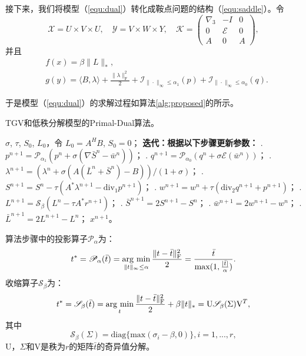 接下来，我们将模型（\ref{equ:dual}）转化成鞍点问题的结构（\ref{equ:saddle}）。令$$\mathcal{X}=U\times V\times U,\quad \mathcal{Y}=V\times W\times Y, \quad
	\mathcal{K}=
\begin{pmatrix}
\nabla_3 & -I & 0\\
0 & \mathcal{E} & 0\\
A & 0 & A
\end{pmatrix},
$$
并且
\begin{equation*}
\begin{aligned}
&f(x)=\beta\|L\|_*,\\
&g(y)=\langle B,\lambda\rangle+\frac{\|\lambda\|_\mathrm{F}^2}{2}+\mathcal{I}_{\|\cdot\|_\infty\leq\alpha_1}(p)+\mathcal{I}_{\|\cdot\|_\infty\leq\alpha_0}(q).
\end{aligned}
\end{equation*}

于是模型（\ref{equ:dual}）的求解过程如算法\ref{alg:proposed}的所示。

\begin{algorithm}
	\caption{TGV和低秩分解模型的Primal-Dual算法。}
	\label{alg:proposed}
	\begin{algorithmic}
		\REQUIRE $\sigma$, $\tau$, $S_0$, $L_0$，令 $L_0=A^HB$, $S_0=0$；
		\INDSTATE[-1.25] \textbf{迭代：根据以下步骤更新参数：}	
		. $p^{n+1} = \mathscr{P}_{\alpha_1}(p^n+\sigma(\nabla \bar{S}^n-\bar{w}^n))$；
		. $q^{n+1} = \mathscr{P}_{\alpha_0}(q^n+\sigma\mathcal{E}(\bar{w}^n))$；
		. $\lambda^{n+1} = (\lambda^{n}+\sigma(A(\bar{L}^n+\bar{S}^n)-B))/(1+\sigma)$；
		. $S^{n+1} = S^n-\tau(A^*\lambda^{n+1}-\mathrm{div}_1 p^{n+1})$；
		. $w^{n+1} = w^n+\tau(\mathrm{div}_2q^{n+1}+p^{n+1})$；
		. $L^{n+1} = \mathscr{S}_\beta(L^n-\tau A^*r^{n+1})$；
		. $\bar{S}^{n+1} = 2S^{n+1}-S^n$；
		. $\bar{w}^{n+1} = 2w^{n+1}-w^n$；
		. $\bar{L}^{n+1} = 2L^{n+1}-L^n$；
		\ENSURE $x^{n+1}$。
	\end{algorithmic}
\end{algorithm}

算法步骤中的投影算子$\mathscr{P}_\alpha$为：
$$t^*=\mathscr{P}_\alpha(\bar{t})=\argmin_{\|t\|_\infty\leq \alpha}\frac{\|t-\bar{t}\|^2_\mathrm{F}}{2}=\frac{\bar{t}}{\text{max}(1,\frac{|\bar{t}|}{\alpha})}.$$
收缩算子$\mathscr{S}_\beta$为：
$$t^*=\mathscr{S}_\beta(\bar{t})=\argmin_{t}\frac{\|t-\bar{t}\|_\mathrm{F}^2}{2}+\beta\|t\|_*=\mathrm{U}\mathscr{S}_\beta(\Sigma)\mathrm{V}^T,$$
其中
$$\mathscr{S}_\beta(\Sigma)=\mathrm{diag}\{\text{max}(\sigma_i-\beta,0)\}, i=1,...,r,$$
$\mathrm{U}$，$\Sigma$和$\mathrm{V}$是秩为$r$的矩阵$\bar{t}$的奇异值分解。


